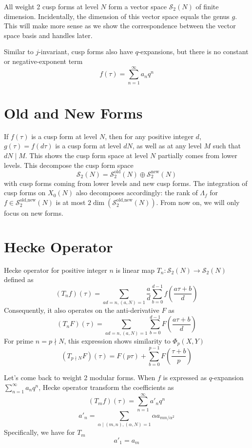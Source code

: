 \documentclass[]{article}
\begin{document}
All weight 2 cusp forms at level $N$ form a vector space $\mathcal{S}_2(N)$ of finite dimension. Incidentally, the dimension of this vector space equals the genus $g$. This will make more sense as we show the correspondence between the vector space basis and handles later.

Similar to $j$-invariant, cusp forms also have $q$-expansions, but there is no constant or negative-exponent term
\[
f(\tau) = \sum_{n = 1}^{\infty} a_n q^n
\]

\section{Old and New Forms}

If $f(\tau)$ is a cusp form at level $N$, then for any positive integer $d$, $g(\tau) = f(d\tau)$ is a cusp form at level $dN$, as well as at any level $M$ such that $dN \mid M$. This shows the cusp form space at level $N$ partially comes from lower levels. This decompose the cusp form space
\[
\mathcal{S}_2(N) =   \mathcal{S}_2^{\mbox{old}}(N) \oplus \mathcal{S}_2^{\mbox{new}}(N)
\]
with cusp forms coming from lower levels and new cusp forms. The integration of cusp forms on $X_0(N)$ also decomposes accordingly: the rank of $\Lambda_f$ for $f\in\mathcal{S}_2^{\mbox{old,new}}(N)$ is at most $2\dim\left(\mathcal{S}_2^{\mbox{old,new}}(N)\right)$. From now on, we will only focus on new forms.

\section{Hecke Operator}
Hecke operator for positive integer $n$ is linear map $T_n: \mathcal{S}_2(N)\to\mathcal{S}_2(N)$ defined as
\[
(T_n f)(\tau) = \sum_{ad=n, (a,N) = 1} \frac{a}{d} \sum_{b = 0}^{d - 1}  f\left(\frac{a\tau+b}{d}\right)
\]
Consequently, it also operates on the anti-derivative $F$ as
\[
(T_n F)(\tau) = \sum_{ad=n, (a,N) = 1}  \sum_{b = 0}^{d - 1}  F\left(\frac{a\tau+b}{d}\right)
\]
For prime $n = p \nmid N$, this expression shows similarity to $\Phi_p(X, Y)$
\[
(T_{p\nmid N} F)(\tau) = F\left(p\tau\right) + \sum_{b = 0}^{p - 1}  F\left(\frac{\tau+b}{p}\right)
\]

Let's come back to weight 2 modular forms. When $f$ is expressed as $q$-expansion $\sum_{n = 1}^{\infty} a_n q^n$, Hecke operator transform the coefficients as
\[
(T_m f)(\tau) = \sum_{n=1}^{\infty} a'_n q^n
\]
\[
a'_n = \sum_{\alpha\mid(m,n),(\alpha,N) = 1} \alpha a_{mn/\alpha^2}
\]
Specifically, we have for $T_m$
\[
a'_1 = a_m
\]
\end{document}
